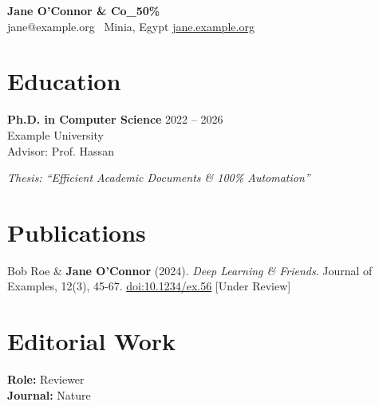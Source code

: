 \documentclass[11pt]{article}
\begin{document}
\begin{center}
{\LARGE\bfseries Jane O'Connor \& Co\_50\%} \\
jane@example.org \textbullet\ Minia, Egypt
\href{https://jane.example.org}{jane.example.org}
\end{center}

\section*{Education}

\textbf{Ph.D. in Computer Science} \hfill 2022 – 2026 \\
Example University \\
Advisor: Prof. Hassan

\textit{Thesis: ``Efficient Academic Documents \& 100\% Automation''}

\section*{Publications}

Bob Roe \& \textbf{Jane O'Connor} (2024). \emph{Deep Learning \& Friends}. Journal of Examples, 12(3), 45-67. \href{https://doi.org/10.1234/ex.56}{doi:10.1234/ex.56} [Under Review]

\section*{Editorial Work}

\textbf{Role:} Reviewer \\
\textbf{Journal:} Nature
\end{document}
